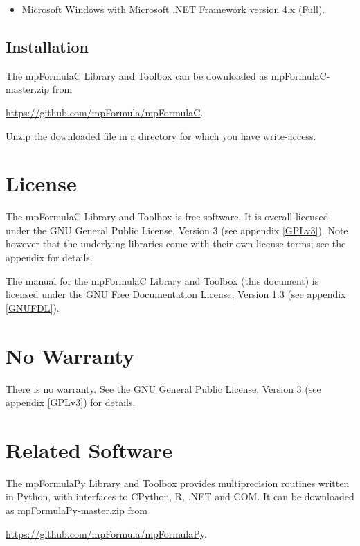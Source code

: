 \begin{itemize}
  \item Microsoft Windows with Microsoft .NET Framework version 4.x (Full).
\end{itemize}



\subsection{Installation}
\label{Installation}
The mpFormulaC Library and Toolbox can be downloaded as mpFormulaC-master.zip from 

\href{https://github.com/mpFormula/mpFormulaC}{https://github.com/mpFormula/mpFormulaC}. 

Unzip the downloaded file in a directory for which you have write-access.




\section{License}
\label{mpFormulaLicense}

The mpFormulaC Library and Toolbox is free software. It is overall licensed under the GNU General Public License, Version 3 (see appendix \ref{GPLv3}). Note however that the underlying libraries come with their own license terms; see the appendix for details.

The manual for the mpFormulaC Library and Toolbox (this document) is licensed under the GNU Free Documentation License, Version 1.3 (see appendix \ref{GNUFDL}).




\section{No Warranty}
\label{No Warranty} 

There is no warranty. See the GNU General Public License, Version 3 (see appendix \ref{GPLv3}) for details.


\section{Related Software}

The mpFormulaPy Library and Toolbox provides multiprecision routines written in Python, with interfaces to CPython, R, .NET and COM. It can be downloaded as mpFormulaPy-master.zip from 

\href{https://github.com/mpFormula/mpFormulaPy}{https://github.com/mpFormula/mpFormulaPy}. 


